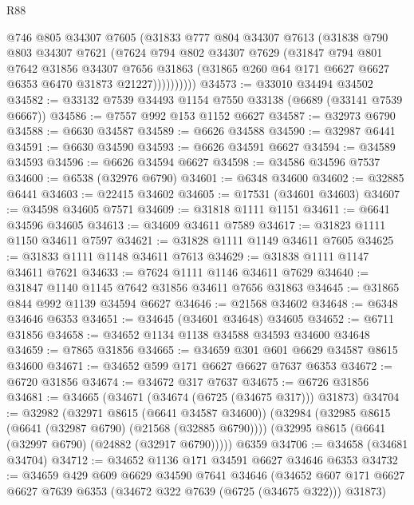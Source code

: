 \begin{lexlean}{R88}
\begin{coremodule}
              @746
              @805
              @34307
              @7605
              (@31833
                @777
                @804
                @34307
                @7613
                (@31838
                  @790
                  @803
                  @34307
                  @7621
                  (@7624
                    @794
                    @802
                    @34307
                    @7629
                    (@31847
                      @794
                      @801
                      @7642
                      @31856
                      @34307
                      @7656
                      @31863
                      (@31865 @260 @64 @171 @6627 @6627 @6353 @6470 @31873 @21227))))))))))
@34573 := @33010 @34494 @34502
@34582 := @33132 @7539 @34493 @1154 @7550 @33138 (@6689 (@33141 @7539 @6667))
@34586 := @7557 @992 @153 @1152 @6627
@34587 := @32973 @6790
@34588 := @6630 @34587
@34589 := @6626 @34588
@34590 := @32987 @6441
@34591 := @6630 @34590
@34593 := @6626 @34591 @6627
@34594 := @34589 @34593
@34596 := @6626 @34594 @6627
@34598 := @34586 @34596 @7537
@34600 := @6538 (@32976 @6790)
@34601 := @6348 @34600
@34602 := @32885 @6441
@34603 := @22415 @34602
@34605 := @17531 (@34601 @34603)
@34607 := @34598 @34605 @7571
@34609 := @31818 @1111 @1151
@34611 := @6641 @34596 @34605
@34613 := @34609 @34611 @7589
@34617 := @31823 @1111 @1150 @34611 @7597
@34621 := @31828 @1111 @1149 @34611 @7605
@34625 := @31833 @1111 @1148 @34611 @7613
@34629 := @31838 @1111 @1147 @34611 @7621
@34633 := @7624 @1111 @1146 @34611 @7629
@34640 := @31847 @1140 @1145 @7642 @31856 @34611 @7656 @31863
@34645 := @31865 @844 @992 @1139 @34594 @6627
@34646 := @21568 @34602
@34648 := @6348 @34646 @6353
@34651 := @34645 (@34601 @34648) @34605
@34652 := @6711 @31856
@34658 := @34652 @1134 @1138 @34588 @34593 @34600 @34648
@34659 := @7865 @31856
@34665 := @34659 @301 @601 @6629 @34587 @8615 @34600
@34671 := @34652 @599 @171 @6627 @6627 @7637 @6353
@34672 := @6720 @31856
@34674 := @34672 @317 @7637
@34675 := @6726 @31856
@34681 := @34665 (@34671 (@34674 (@6725 (@34675 @317))) @31873)
@34704 := @32982
    (@32971 @8615 (@6641 @34587 @34600))
    (@32984
      (@32985 @8615 (@6641 (@32987 @6790) (@21568 (@32885 @6790))))
      (@32995 @8615 (@6641 (@32997 @6790) (@24882 (@32917 @6790)))))
    @6359
@34706 := @34658 (@34681 @34704)
@34712 := @34652 @1136 @171 @34591 @6627 @34646 @6353
@34732 := @34659
    @429
    @609
    @6629
    @34590
    @7641
    @34646
    (@34652 @607 @171 @6627 @6627 @7639 @6353 (@34672 @322 @7639 (@6725 (@34675 @322))) @31873)

\end{coremodule}
\end{lexlean}
